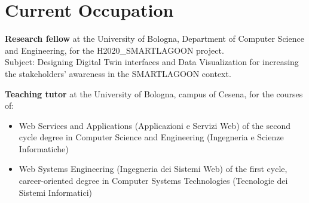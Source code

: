 \section{Current Occupation}

\textbf{Research fellow} at the University of Bologna, Department of Computer Science and Engineering, for the H2020\_SMARTLAGOON project.\\
Subject: Designing Digital Twin interfaces and Data Visualization for increasing the stakeholders' awareness in the SMARTLAGOON context.

\textbf{Teaching tutor} at the University of Bologna, campus of Cesena, for the courses of:
\begin{itemize}
  \item Web Services and Applications (Applicazioni e Servizi Web) of the second cycle degree in Computer Science and Engineering (Ingegneria e Scienze Informatiche)
  \item Web Systems Engineering (Ingegneria dei Sistemi Web) of the first cycle, career-oriented degree in Computer Systems Technologies (Tecnologie dei Sistemi Informatici)
\end{itemize}

\vspace{20pt}
